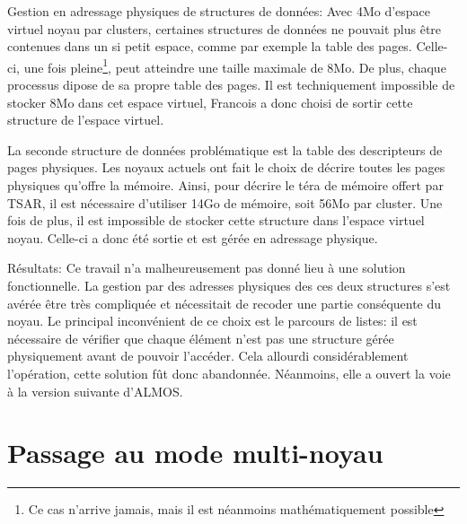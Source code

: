       \begin{paragraph}{Gestion en adressage physiques de structures de données:}
        Avec 4Mo d'espace virtuel noyau par clusters, certaines structures de
        données ne pouvait plus être contenues dans un si petit espace, comme
        par exemple la table des pages. Celle-ci, une fois pleine\footnote{Ce
          cas n'arrive jamais, mais il est néanmoins mathématiquement possible},
        peut atteindre une taille maximale de 8Mo. De plus, chaque processus
        dipose de sa propre table des pages. Il est techniquement impossible de
        stocker 8Mo dans cet espace virtuel, Francois a donc choisi de sortir
        cette structure de l'espace virtuel.

        La seconde structure de données problématique est la table des
        descripteurs de pages physiques. Les noyaux actuels ont fait le choix de
        décrire toutes les pages physiques qu'offre la mémoire. Ainsi, pour
        décrire le téra de mémoire offert par TSAR, il est nécessaire
        d'utiliser 14Go de mémoire, soit 56Mo par cluster. Une fois de plus, il
        est impossible de stocker cette structure dans l'espace virtuel
        noyau. Celle-ci a donc été sortie et est gérée en adressage physique.
      \end{paragraph}

      \begin{paragraph}{Résultats:}
        Ce travail n'a malheureusement pas donné lieu à une solution
        fonctionnelle. La gestion par des adresses physiques des ces deux
        structures s'est avérée être très compliquée et nécessitait de recoder
        une partie conséquente du noyau. Le principal inconvénient de ce choix
        est le parcours de listes: il est nécessaire de vérifier que chaque
        élément n'est pas une structure gérée physiquement avant de pouvoir
        l'accéder. Cela allourdi considérablement l'opération, cette solution
        fût donc abandonnée. Néanmoins, elle a ouvert la voie à la version
        suivante d'ALMOS.
      \end{paragraph}

      
  \section{Passage au mode multi-noyau}
  \label{sec:multi-noyau}

